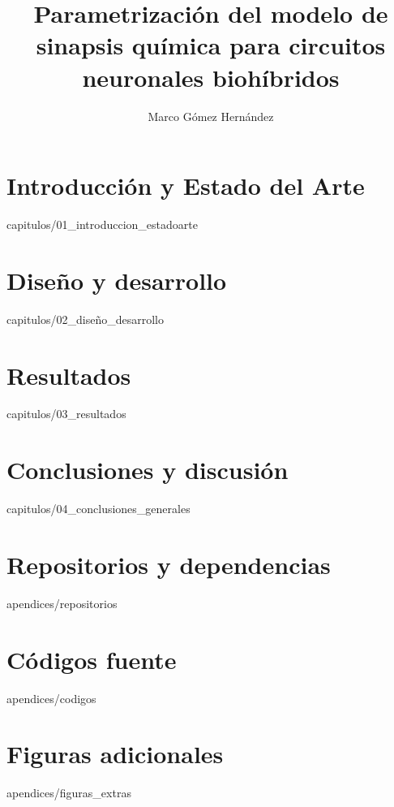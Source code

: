 \documentclass[epsbased,copyright,final,printable,covers,extendedindex,firstnumbered,tfg,gnuplot,loc,loe,lof]{tfgtfmthesisuam}
\title{Parametrización del modelo de sinapsis química para circuitos neuronales biohíbridos}
\author{Marco Gómez Hernández}
\begin{document}
\chapter{Introducción y Estado del Arte\label{CAP:INTRODUCCIONYESTADOARTE}}{capitulos/01_introduccion_estadoarte}

\chapter{Diseño y desarrollo\label{CAP:DISEÑOYDESARROLLO}}{capitulos/02_diseño_desarrollo}

\chapter{Resultados\label{CAP:RESULTADOS}}{capitulos/03_resultados}

\chapter{Conclusiones y discusión\label{CAP:CONCLUSIONES}}{capitulos/04_conclusiones_generales}


\appendix

\chapter{Repositorios y dependencias\label{CAP:REPOSITORIOSREPO}}{apendices/repositorios}

\chapter{Códigos fuente\label{CAP:CODIGOSFUENTE}}{apendices/codigos}

\chapter{Figuras adicionales\label{CAP:FIGURASADICIONALES}}{apendices/figuras_extras}
\end{document}
